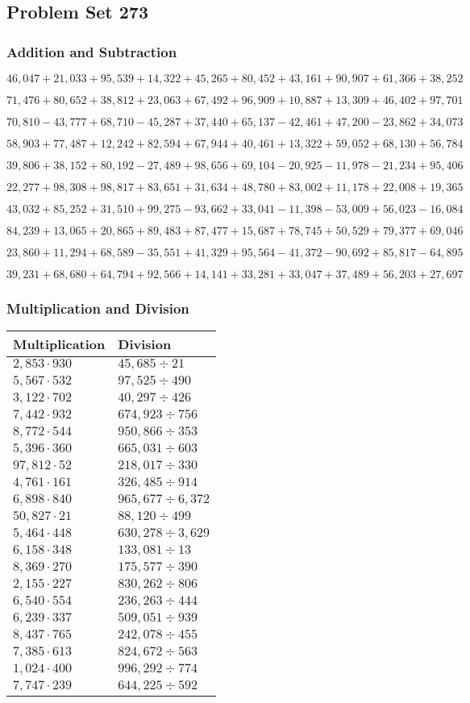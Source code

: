 \hypertarget{problem-set-273}{%
\subsection{Problem Set 273}\label{problem-set-273}}

\hypertarget{addition-and-subtraction}{%
\subsubsection{Addition and
Subtraction}\label{addition-and-subtraction}}

\(46,047+21,033+95,539+14,322+45,265+80,452+43,161+90,907+61,366+38,252\)

\(71,476+80,652+38,812+23,063+67,492+96,909+10,887+13,309+46,402+97,701\)

\(70,810-43,777+68,710-45,287+37,440+65,137-42,461+47,200-23,862+34,073\)

\(58,903+77,487+12,242+82,594+67,944+40,461+13,322+59,052+68,130+56,784\)

\(39,806+38,152+80,192-27,489+98,656+69,104-20,925-11,978-21,234+95,406\)

\(22,277+98,308+98,817+83,651+31,634+48,780+83,002+11,178+22,008+19,365\)

\(43,032+85,252+31,510+99,275-93,662+33,041-11,398-53,009+56,023-16,084\)

\(84,239+13,065+20,865+89,483+87,477+15,687+78,745+50,529+79,377+69,046\)

\(23,860+11,294+68,589-35,551+41,329+95,564-41,372-90,692+85,817-64,895\)

\(39,231+68,680+64,794+92,566+14,141+33,281+33,047+37,489+56,203+27,697\)

\hypertarget{multiplication-and-division}{%
\subsubsection{Multiplication and
Division}\label{multiplication-and-division}}

\begin{longtable}[]{@{}ll@{}}
\toprule
Multiplication & Division\tabularnewline
\midrule
\endhead
\(2,853\cdot930\) & \(45,685÷21\)\tabularnewline
\(5,567\cdot532\) & \(97,525÷490\)\tabularnewline
\(3,122\cdot702\) & \(40,297÷426\)\tabularnewline
\(7,442\cdot932\) & \(674,923÷756\)\tabularnewline
\(8,772\cdot544\) & \(950,866÷353\)\tabularnewline
\(5,396\cdot360\) & \(665,031÷603\)\tabularnewline
\(97,812\cdot52\) & \(218,017÷330\)\tabularnewline
\(4,761\cdot161\) & \(326,485÷914\)\tabularnewline
\(6,898\cdot840\) & \(965,677÷6,372\)\tabularnewline
\(50,827\cdot21\) & \(88,120÷499\)\tabularnewline
\(5,464\cdot448\) & \(630,278÷3,629\)\tabularnewline
\(6,158\cdot348\) & \(133,081÷13\)\tabularnewline
\(8,369\cdot270\) & \(175,577÷390\)\tabularnewline
\(2,155\cdot227\) & \(830,262÷806\)\tabularnewline
\(6,540\cdot554\) & \(236,263÷444\)\tabularnewline
\(6,239\cdot337\) & \(509,051÷939\)\tabularnewline
\(8,437\cdot765\) & \(242,078÷455\)\tabularnewline
\(7,385\cdot613\) & \(824,672÷563\)\tabularnewline
\(1,024\cdot400\) & \(996,292÷774\)\tabularnewline
\(7,747\cdot239\) & \(644,225÷592\)\tabularnewline
\bottomrule
\end{longtable}
